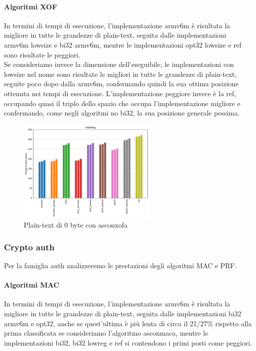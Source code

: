 \documentclass[12pt,a4paper,italian]{report}
\begin{document}
\paragraph{Algoritmi XOF}

In termini di tempi di esecuzione, l'implementazione armv6m è risultata la migliore in tutte le grandezze di plain-text, seguita dalle implementazioni armv6m lowsize e bi32 armv6m, mentre le implementazioni opt32 lowsize e ref sono risultate le peggiori. \\

\noindent Se consideriamo invece la dimensione dell'eseguibile, le implementazioni con lowsize nel nome sono risultate le migliori in tutte le grandezze di plain-text, seguite poco dopo dalla armv6m, confermando quindi la sua ottima posizione ottenuta nei tempi di esecuzione. L'implementazione peggiore invece è la ref, occupando quasi il triplo dello spazio che occupa l'implementazione migliore e confermando, come negli algoritmi no bi32, la sua posizione generale pessima.

\begin{figure}[H]
    \centering
    \includegraphics[width=0.6\textwidth]{adafruit/asconxofa.pdf}
    \caption{Plain-text di 0 byte con asconxofa}
\end{figure}

\subsubsection{Crypto auth}

Per la famiglia auth analizzeremo le prestazioni degli algoritmi MAC e PRF.

\paragraph{Algoritmi MAC}

In termini di tempi di esecuzione, l'implementazione armv6m è risultata la migliore in tutte le grandezze di plain-text, seguita dalle implementazioni bi32 armv6m e opt32, anche se quest'ultima è più lenta di circa il 21/27\% rispetto alla prima classificata se consideriamo l'algoritmo asconmaca, mentre le implementazioni bi32, bi32 lowreg e ref si contendono i primi posti come peggiori. \\
\end{document}
